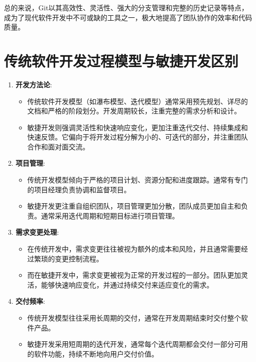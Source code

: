 \documentclass[12pt]{article}
\begin{document}
	总的来说，Git以其高效性、灵活性、强大的分支管理和完整的历史记录等特点，成为了现代软件开发中不可或缺的工具之一，极大地提高了团队协作的效率和代码质量。
	
	\section{传统软件开发过程模型与敏捷开发区别}
	
	\begin{enumerate}
		\item \textbf{开发方法论}:
		\begin{itemize}
			\item 传统软件开发模型（如瀑布模型、迭代模型）通常采用预先规划、详尽的文档和严格的阶段划分。开发周期较长，注重完整的需求分析和设计。
			\item 敏捷开发则强调灵活性和快速响应变化，更加注重迭代交付、持续集成和快速反馈。它偏向于将开发过程分解为小的、可迭代的部分，并注重团队合作和面对面交流。
		\end{itemize}
		
		\item \textbf{项目管理}:
		\begin{itemize}
			\item 传统开发模型倾向于严格的项目计划、资源分配和进度跟踪。通常有专门的项目经理负责协调和监督项目。
			\item 敏捷开发更注重自组织团队，项目管理更加分散，团队成员更加自主和负责。通常采用迭代周期和短期目标进行项目管理。
		\end{itemize}
		
		\item \textbf{需求变更处理}:
		\begin{itemize}
			\item 在传统开发中，需求变更往往被视为额外的成本和风险，并且通常需要经过繁琐的变更控制流程。
			\item 而在敏捷开发中，需求变更被视为正常的开发过程的一部分。团队更加灵活，能够快速响应变化，并通过持续交付来适应变化的需求。
		\end{itemize}
		
		\item \textbf{交付频率}:
		\begin{itemize}
			\item 传统开发模型往往采用长周期的交付，通常在开发周期结束时交付整个软件产品。
			\item 敏捷开发采用短周期的迭代开发，通常每个迭代周期都会交付一部分可用的软件功能，持续不断地向用户交付价值。
		\end{itemize}
	\end{enumerate}
\end{document}
